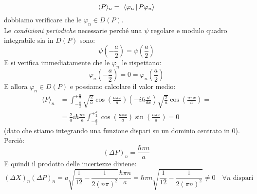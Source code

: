 \documentclass[../../FisicaTeorica.tex]{subfiles}
\begin{document}
\begin{enumerate}
\[
\langle P \rangle_n =\ \Braket{\varphi_n |P\varphi_n}
\]
dobbiamo verificare che le $\varphi_n \in D(P)$.\\
Le \textit{condizioni periodiche} necessarie perché una $\psi$ regolare e modulo quadro integrabile sia in $D(P)$ sono:
\[
\psi\left(-\frac{a}{2}\right)=\psi\left(\frac{a}{2}\right)
\]
E si verifica immediatamente che le $\varphi_n$ le rispettano:
\[
\varphi_n\left(-\frac{a}{2}\right)=0=\varphi_n\left(\frac{a}{2}\right)
\]
E allora $\varphi_n \in D(P)$ e possiamo calcolare il valor medio:
\begin{align*}
\langle P \rangle_n &= \int_{-\frac{a}{2}}^{+\frac{a}{2}}\sqrt{\frac{2}{a}}\cos\left(\frac{n\pi x}{a}\right) \left(-i\hbar\frac{d}{dx}\right) \sqrt{\frac{2}{a}}\cos\left(\frac{n\pi x}{a}\right)= 
\\
&=\frac{2}{a}i\hbar \frac{n\pi}{a} \int_{-\frac{a}{2}}^{+\frac{a}{2}} \cos\left(\frac{n\pi x}{a}\right) \sin\left(\frac{n\pi x}{a}\right) = 0
\end{align*}
(dato che stiamo integrando una funzione dispari su un dominio centrato in $0$). Perciò: 
\[
(\Delta P)_n = \frac{\hbar \pi n}{a}
\]
E quindi il prodotto delle incertezze diviene:
\[
(\Delta X)_n(\Delta P)_n =a \sqrt{\frac{1}{12}-\frac{1}{2(n\pi)^2}}\frac{\hbar \pi n}{a}=\hbar \pi n \sqrt{\frac{1}{12}-\frac{1}{2(\pi n)^2}} \neq 0 \quad \forall n \text{ dispari}
\]


\end{enumerate}
\end{document}
